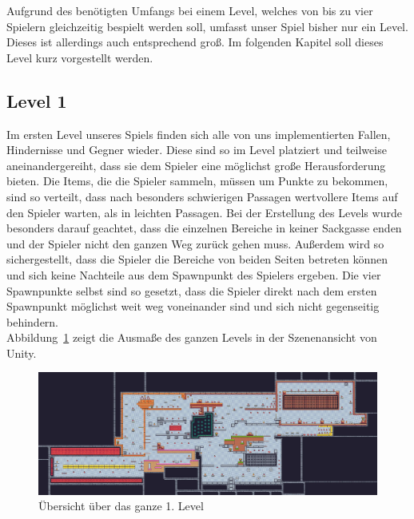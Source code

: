 Aufgrund des benötigten Umfangs bei einem Level, welches von bis zu vier Spielern gleichzeitig bespielt werden soll, umfasst unser Spiel bisher nur ein Level. Dieses ist allerdings auch entsprechend groß. Im folgenden Kapitel soll dieses Level kurz vorgestellt werden.

\subsection{Level 1}

Im ersten Level unseres Spiels finden sich alle von uns implementierten Fallen, Hindernisse und Gegner wieder. Diese sind so im Level platziert und teilweise aneinandergereiht, dass sie dem Spieler eine möglichst große Herausforderung bieten. Die Items, die die Spieler sammeln, müssen um Punkte zu bekommen, sind so verteilt, dass nach besonders schwierigen Passagen wertvollere Items auf den Spieler warten, als in leichten Passagen. Bei der Erstellung des Levels wurde besonders darauf geachtet, dass die einzelnen Bereiche in keiner Sackgasse enden und der Spieler nicht den ganzen Weg zurück gehen muss. Außerdem wird so sichergestellt, dass die Spieler die Bereiche von beiden Seiten betreten können und sich keine Nachteile aus dem Spawnpunkt des Spielers ergeben. Die vier Spawnpunkte selbst sind so gesetzt, dass die Spieler direkt nach dem ersten Spawnpunkt möglichst weit weg voneinander sind und sich nicht gegenseitig behindern.\\

Abbildung~\ref{fig:level1} zeigt die Ausmaße des ganzen Levels in der Szenenansicht von Unity.

\begin{figure}[th]
\centering
\includegraphics[width=155mm]{Figures/level1.jpg}
\decoRule
\caption[Übersicht über das ganze 1. Level]{Übersicht über das ganze 1. Level}
\label{fig:level1}
\end{figure}


